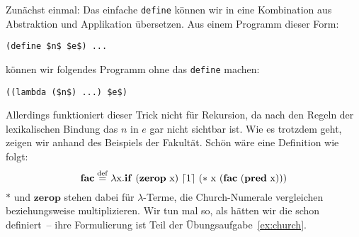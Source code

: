 Zunächst einmal: Das einfache \lstinline{define} können wir in eine
Kombination aus Abstraktion und Applikation übersetzen.  Aus einem
Programm dieser Form:
%
\begin{lstlisting}
(define $n$ $e$) ...
\end{lstlisting}
%
können wir folgendes Programm ohne das \lstinline{define} machen:
%
\begin{lstlisting}
((lambda ($n$) ...) $e$)
\end{lstlisting}
%
Allerdings funktioniert dieser Trick nicht für Rekursion, da nach den
Regeln der lexikalischen Bindung das $n$ in $e$ gar nicht sichtbar
ist.  Wie es trotzdem geht, zeigen wir anhand des Beispiels der Fakultät.
Schön wäre eine Definition wie folgt:
%
\begin{displaymath}
  \mathbf{fac} \stackrel{\rm def}{=}{} \lambda \mathrm x.\mathbf{if}~(\mathbf{zerop}~\mathrm
  x)~\lceil 1\rceil ~(\ast~\mathrm x~(\mathbf{fac}~(\mathbf{pred}~\mathrm x)))
\end{displaymath}
%
$\ast$ und $\mathbf{zerop}$ stehen dabei für $\lambda$-Terme, die Church-Numerale
vergleichen beziehungsweise multiplizieren.  Wir tun mal so, als
hätten wir die schon definiert~-- ihre Formulierung ist Teil der
Übungsaufgabe~\ref{ex:church}.

